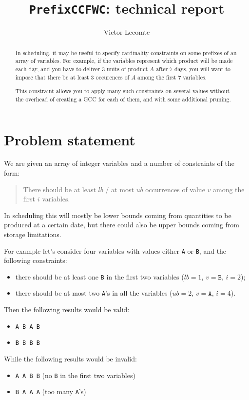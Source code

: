 \documentclass[a4paper,10pt]{article}
\begin{document}
\title{\texttt{PrefixCCFWC}: technical report}
\author{Victor Lecomte}
\maketitle

\begin{abstract}
In scheduling, it may be useful to specify cardinality constraints on some prefixes of an array of variables. For example, if the variables represent which product will be made each day, and you have to deliver 3 units of product $A$ after 7 days, you will want to impose that there be at least 3 occurences of $A$ among the first 7 variables.

This constraint allows you to apply many such constraints on several values without the overhead of creating a GCC for each of them, and with some additional pruning.
\end{abstract}

\tableofcontents

\section{Problem statement}
We are given an array of integer variables and a number of constraints of the form:
\begin{quote}
There should be at least $lb$ / at most $ub$ occurrences of value $v$ among the first $i$ variables.
\end{quote}
In scheduling this will mostly be lower bounds coming from quantities to be produced at a certain date, but there could also be upper bounds coming from storage limitations.

For example let's consider four variables with values either \texttt{A} or \texttt{B}, and the following constraints:
\begin{itemize}
    \item there should be at least one \texttt{B} in the first two variables ($lb=1$, $v=\texttt{B}$, $i=2$);
    \item there should be at most two \texttt{A}'s in all the variables ($ub=2$, $v=\texttt{A}$, $i=4$).
\end{itemize}
Then the following results would be valid:
\begin{itemize}
    \item \texttt{A B A B}
    \item \texttt{B B B B}
\end{itemize}
While the following results would be invalid:
\begin{itemize}
    \item \texttt{A A B B} (no \texttt{B} in the first two variables)
    \item \texttt{B A A A} (too many \texttt{A}'s)
\end{itemize}
\end{document}
